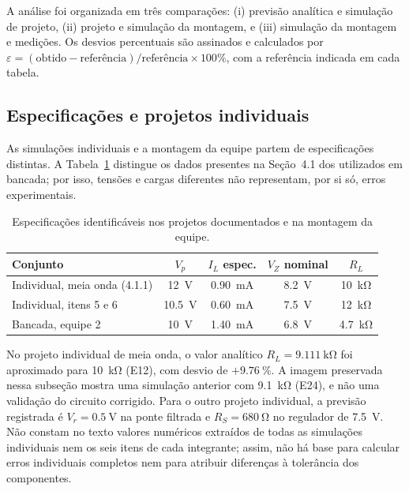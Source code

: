 \documentclass[11pt,a4paper]{article}
\begin{document}
A análise foi organizada em três comparações: (i) previsão analítica e simulação de projeto, (ii) projeto e simulação da montagem, e (iii) simulação da montagem e medições. Os desvios percentuais são assinados e calculados por
\(\varepsilon=(\text{obtido}-\text{referência})/\text{referência}\times100\%\), com a referência indicada em cada tabela.

\subsection{Especificações e projetos individuais}

As simulações individuais e a montagem da equipe partem de especificações distintas. A Tabela~\ref{tab:discussao_especificacoes} distingue os dados presentes na Seção~4.1 dos utilizados em bancada; por isso, tensões e cargas diferentes não representam, por si só, erros experimentais.

\begin{table}[H]
\centering
\small
\caption{Especificações identificáveis nos projetos documentados e na montagem da equipe.}
\label{tab:discussao_especificacoes}
\begin{tabular}{@{}lcccc@{}}
\toprule
\textbf{Conjunto} & \(V_p\) & \(I_L\) espec. & \(V_Z\) nominal & \(R_L\) \\
\midrule
Individual, meia onda (4.1.1) & \SI{12}{\volt} & \SI{0,90}{\milli\ampere} & \SI{8,2}{\volt} & \SI{10}{\kilo\ohm} \\
Individual, itens 5 e 6 & \SI{10,5}{\volt} & \SI{0,60}{\milli\ampere} & \SI{7,5}{\volt} & \SI{12}{\kilo\ohm} \\
Bancada, equipe 2 & \SI{10}{\volt} & \SI{1,40}{\milli\ampere} & \SI{6,8}{\volt} & \SI{4,7}{\kilo\ohm} \\
\bottomrule
\end{tabular}
\end{table}

No projeto individual de meia onda, o valor analítico \(R_L=\SI{9,111}{\kilo\ohm}\) foi aproximado para \SI{10}{\kilo\ohm} (E12), com desvio de \(+\SI{9,76}{\percent}\). A imagem preservada nessa subseção mostra uma simulação anterior com \SI{9,1}{\kilo\ohm} (E24), e não uma validação do circuito corrigido. Para o outro projeto individual, a previsão registrada é \(V_r=\SI{0,5}{\volt}\) na ponte filtrada e \(R_S=\SI{680}{\ohm}\) no regulador de \SI{7,5}{\volt}. Não constam no texto valores numéricos extraídos de todas as simulações individuais nem os seis itens de cada integrante; assim, não há base para calcular erros individuais completos nem para atribuir diferenças à tolerância dos componentes.
\end{document}
